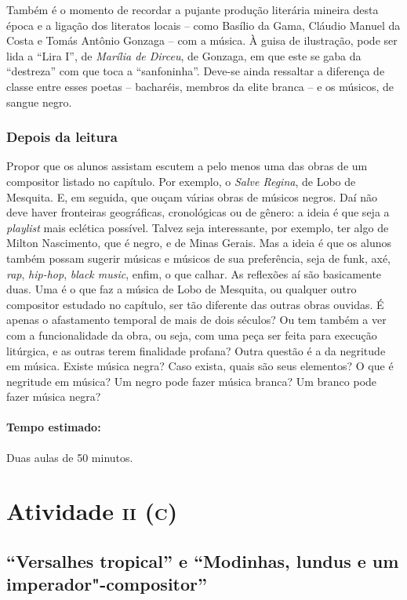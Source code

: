 \documentclass[11pt]{extarticle}
\begin{document}
Também é o momento de recordar a pujante produção literária mineira desta
época e a ligação dos literatos locais – como Basílio da Gama, Cláudio Manuel
da Costa e Tomás Antônio Gonzaga – com a música. À guisa de ilustração, pode
ser lida a ``Lira I'', de \emph{Marília de Dirceu}, de Gonzaga, em que este se gaba da
“destreza” com que toca a “sanfoninha”. Deve-se ainda ressaltar a diferença de
classe entre esses poetas – bacharéis, membros da elite branca –  e os músicos,
de sangue negro.

\subsubsection{Depois da leitura}

Propor que os alunos assistam escutem a pelo menos uma das obras de um
compositor listado no capítulo. Por exemplo, o \emph{Salve Regina}, de Lobo de
Mesquita. E, em seguida, que ouçam várias obras de músicos negros. Daí não deve
haver fronteiras geográficas, cronológicas ou de gênero: a ideia é que seja a
\textit{playlist} mais eclética possível. Talvez seja interessante, por exemplo, ter
algo de Milton Nascimento, que é negro, e de Minas Gerais. Mas a ideia é que os
alunos também possam sugerir músicas e músicos de sua preferência, seja de
funk, axé, \textit{rap}, \textit{hip-hop}, \textit{black music}, enfim, o que calhar. As reflexões aí são
basicamente duas. Uma é o que faz a música de Lobo de Mesquita, ou qualquer
outro compositor estudado no capítulo, ser tão diferente das outras obras
ouvidas. É apenas o afastamento temporal de mais de dois séculos? Ou tem também
a ver com a funcionalidade da obra, ou seja, com uma peça ser feita para
execução litúrgica, e as outras terem finalidade profana? Outra questão é a da
negritude em música. Existe música negra? Caso exista, quais são seus
elementos? O que é negritude em música? Um negro pode fazer música branca? Um
branco pode fazer música negra?

\paragraph{Tempo estimado:} Duas aulas de 50 minutos. 

\section{Atividade \textsc{ii (c)}}

\subsection{``Versalhes tropical'' e ``Modinhas, lundus e um
imperador"-compositor''}
\end{document}
